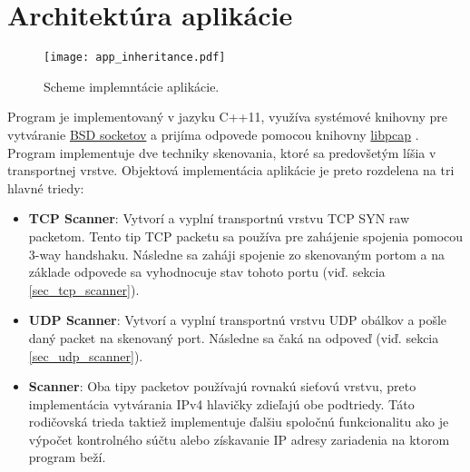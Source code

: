 \documentclass[a4paper, 11pt]{article}
\begin{document}
\section{Architektúra aplikácie}
\begin{wrapfigure}{r}{0.3\textwidth}
	\centering
	\texttt{[image: app\_inheritance.pdf]}
	\caption{Scheme implemntácie aplikácie.}
	\label{obr1}
\end{wrapfigure} 
 Program je implementovaný v jazyku C++11, využíva systémové knihovny pre vytváranie  \href{http://pubs.opengroup.org/onlinepubs/007908775/xns/syssocket.h.html}{BSD socketov} a prijíma odpovede pomocou knihovny \href{https://www.tcpdump.org/}{libpcap} . Program implementuje dve techniky skenovania, ktoré sa predovšetým líšia v transportnej vrstve. Objektová implementácia aplikácie je preto rozdelena na tri hlavné triedy:
 \begin{itemize}
 	\item \textbf{TCP Scanner}: Vytvorí a vyplní transportnú vrstvu TCP SYN raw packetom. Tento tip TCP packetu sa používa pre zahájenie spojenia pomocou 3-way handshaku. %
 	 Následne sa zaháji spojenie zo skenovaným portom a na základe odpovede sa vyhodnocuje stav tohoto portu (viď. sekcia \ref{sec_tcp_scanner}).
 	\item \textbf{UDP Scanner}: Vytvorí a vyplní transportnú vrstvu UDP obálkov a pošle daný packet na skenovaný port. Následne sa čaká na odpoveď (viď. sekcia \ref{sec_udp_scanner}).
 	\item \textbf{Scanner}: Oba tipy packetov používajú rovnakú sieťovú vrstvu, preto implementácia vytvárania IPv4 hlavičky zdieľajú obe podtriedy. Táto rodičovská trieda taktiež implementuje ďalšiu spoločnú funkcionalitu ako je výpočet kontrolného súčtu alebo získavanie IP adresy zariadenia na ktorom program beží.
 \end{itemize}
\end{document}
